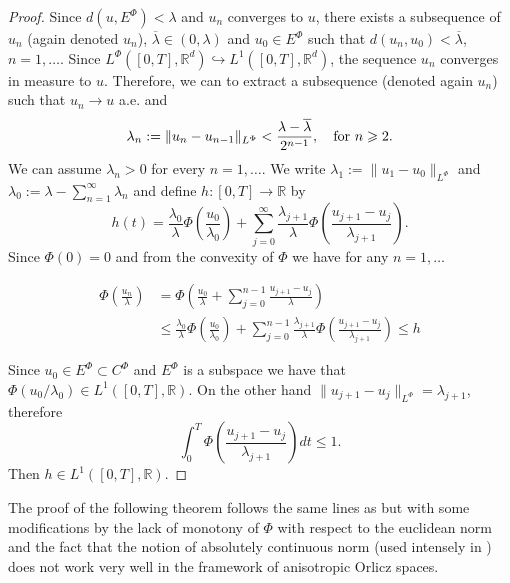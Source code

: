 \documentclass[twoside]{article}
\theoremstyle{remark}
\newcommand{\orlnor}{\|_{L^{\Phi}}}
\newcommand{\lphi}{L^{\Phi}}
\newcommand{\ephi}{E^{\Phi}}
\newcommand{\claseor}{C^{\Phi}}
\newcommand{\rr}{\mathbb{R}}
\renewcommand{\leq}{\leqslant}
\renewcommand{\geq}{\geqslant}
\begin{document}
\begin{proof}
  Since $d({u},\ephi)<\lambda$ and ${u}_n$ converges to ${u}$, there exists   a subsequence of $u_n$ (again denoted $u_n$), $\overline{\lambda}\in (0,\lambda)$ and $u_0\in\ephi$ such that $d(u_n,u_0)<\overline{\lambda}$, $n=1,\ldots$. Since $\lphi\left([0,T],\rr^d\right)\hookrightarrow L^1\left([0,T],\rr^d\right)$, the sequence $u_n$ converges in measure to $u$. Therefore, we can to extract a subsequence (denoted again $u_n$) such that $u_n\to u$ a.e. and
  \[\lambda_{n}:=\|{u}_{n}-{u}_{n-1}\orlnor<\frac{\lambda-\overline{\lambda}}{2^{n-1}},\quad\hbox{for } n\geq 2.\]
 We can assume $\lambda_n>0$ for every $n=1,\ldots$. We write $\lambda_1:=\|u_1-u_0\orlnor$ and  $\lambda_0:=\lambda-\sum_{n=1}^{\infty}\lambda_n$ and define $h:[0,T]\rightarrow\mathbb{R}$  by
 \begin{equation}\label{eq:serie} h(t)=  \frac{\lambda_0}{\lambda}\Phi\left(\frac{u_0}{\lambda_0}\right)+\sum_{j=0}^{\infty}\frac{\lambda_{j+1}}{\lambda}\Phi\left(\frac{u_{j+1}-u_j}{\lambda_{j+1}}\right).
\end{equation}
 Since $\Phi(0)=0$ and from the convexity of $\Phi$ we have for any $n=1,\ldots$


\[
 \begin{split}
   \Phi\left(\frac{u_n}{\lambda}\right) &=\Phi\left(  \frac{u_0}{\lambda}+   \sum_{j=0}^{n-1}\frac{u_{j+1}-u_j}{\lambda} \right)\\
   &\leq
   \frac{\lambda_0}{\lambda}\Phi\left(\frac{u_0}{\lambda_0}\right)+\sum_{j=0}^{n-1}\frac{\lambda_{j+1}}{\lambda}\Phi\left(\frac{u_{j+1}-u_j}{\lambda_{j+1}}\right) \leq h
 \end{split}
\]

Since $u_0\in\ephi\subset \claseor$ and $\ephi$ is a subspace we have that $\Phi(u_0/\lambda_0)\in L^1([0,T],\rr)$.
On the other hand $\|u_{j+1}-u_j\orlnor = \lambda_{j+1}$, therefore
\[
\int_0^T\Phi\left(\frac{u_{j+1}-u_j}{\lambda_{j+1}}\right)dt\leq 1.
\]
Then $h\in L^1([0,T],\rr)$.



\end{proof}





The  proof of the following theorem follows the same lines as \cite[Th. 3.2]{ABGMS2015} but with some modifications by the lack of monotony of $\Phi$ with  respect to the euclidean norm and the fact that  the notion of absolutely continuous norm (used intensely in \cite[Th. 3.2]{ABGMS2015}) does not work very well in the framework of anisotropic Orlicz spaces.
\end{document}
